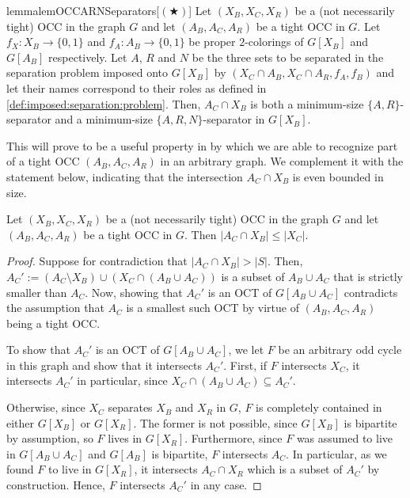 \begin{restatable}{lemma}{lemOCCARNSeparators}[$(\bigstar)$] \label{lem:tight:occ:cut:optimal:ARN:separator}
	Let $(X_B, X_C, X_R)$ be a (not necessarily tight) OCC in the graph $G$ and let $(A_B, A_C, A_R)$ be a tight OCC in $G$. Let $f_X \colon X_B \rightarrow \{0, 1\}$ and $f_A \colon A_B \rightarrow \{0, 1\}$ be proper $2$-colorings of $G[X_B]$ and $G[A_B]$ respectively. Let $A$, $R$ and $N$ be the three sets to be separated in the separation problem imposed onto $G[X_B]$ by $(X_C \cap A_B, X_C \cap A_R, f_A, f_B)$ and let their names correspond to their roles as defined in \cref{def:imposed:separation:problem}. Then, $A_C \cap X_B$ is both a minimum-size $\{A, R\}$-separator and a minimum-size $\{A, R, N\}$-separator in $G[X_B]$.
\end{restatable}


This will prove to be a useful property in  by which we are able to recognize part of a tight OCC $(A_B, A_C, A_R)$ in an arbitrary graph. We complement it with the statement below, indicating that the intersection $A_C \cap X_B$ is even bounded in size.

\begin{lemma} \label{lem:small:occ:intersection}
	Let $(X_B, X_C, X_R)$ be a (not necessarily tight) OCC in the graph $G$ and let $(A_B, A_C, A_R)$ be a tight OCC in $G$. Then $|A_C \cap X_B| \leq |X_C|$.
\end{lemma}
\begin{proof}
	Suppose for contradiction that $|A_C \cap X_B| > |S|$. Then, $A_C' := (A_C \setminus X_B) \cup (X_C \cap (A_B \cup A_C))$ is a subset of $A_B \cup A_C$ that is strictly smaller than $A_C$. Now, showing that $A_C'$ is an OCT of $G[A_B \cup A_C]$ contradicts the assumption that $A_C$ is a smallest such OCT by virtue of $(A_B, A_C, A_R)$ being a tight OCC.
	
	To show that $A_C'$ is an OCT of $G[A_B \cup A_C]$, we let $F$ be an arbitrary odd cycle in this graph and show that it intersects $A_C'$. First, if $F$ intersects $X_C$, it intersects $A_C'$ in particular, since $X_C \cap (A_B \cup A_C) \subseteq A_C'$.
	
	Otherwise, since $X_C$ separates $X_B$ and $X_R$ in $G$, $F$ is completely contained in either $G[X_B]$ or $G[X_R]$. The former is not possible, since $G[X_B]$ is bipartite by assumption, so $F$ lives in $G[X_R]$. Furthermore, since $F$ was assumed to live in $G[A_B \cup A_C]$ and $G[A_B]$ is bipartite, $F$ intersects $A_C$. In particular, as we found $F$ to live in $G[X_R]$, it intersects $A_C \cap X_R$ which is a subset of $A_C'$ by construction. Hence, $F$ intersects $A_C'$ in any case.
\end{proof}


